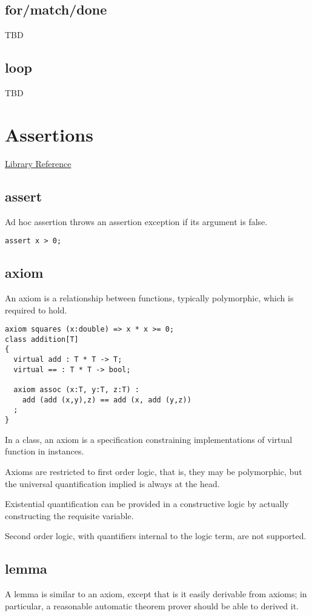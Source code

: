 \documentclass[oneside]{book}
\begin{document}
\subsection{for/match/done}
TBD
\subsection{loop}
TBD
\section{Assertions}
\href{http://felix-lang.org/share/lib/grammar/assertions.fsyn}{Library Reference}
\subsection{assert}
Ad hoc assertion throws an assertion exception if its argument
is false. 

\begin{verbatim}
assert x > 0;
\end{verbatim}


\subsection{axiom}
An axiom is a relationship between functions, typically
polymorphic, which is required to hold.

\begin{verbatim}
axiom squares (x:double) => x * x >= 0;
class addition[T]
{
  virtual add : T * T -> T;
  virtual == : T * T -> bool;

  axiom assoc (x:T, y:T, z:T) : 
    add (add (x,y),z) == add (x, add (y,z))
  ;
}
\end{verbatim}

In a class, an axiom is a specification constraining
implementations of virtual function in instances.

Axioms are restricted to first order logic, that is, they
may be polymorphic, but the universal quantification implied
is always at the head.

Existential quantification can be provided in a constructive
logic by actually constructing the requisite variable.

Second order logic, with quantifiers internal to the 
logic term, are not supported.

\subsection{lemma}
A lemma is similar to an axiom, except that is it
easily derivable from axioms; in particular,
a reasonable automatic theorem prover should
be able to derived it.
\end{document}

